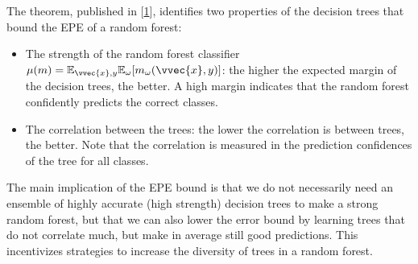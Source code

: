\documentclass[letterpaper,10pt,english]{jupyterBook}
\begin{document}
\sphinxAtStartPar
The theorem, published in {[}\hyperlink{cite.bibliography:id2}{1}{]}, identifies two properties of the decision trees that bound the EPE of a random forest:
\begin{itemize}
\item {} 
\sphinxAtStartPar
The strength of the random forest classifier \(\mu(m)=\mathbb{E}_{\vvec{x},y}\mathbb{E}_\omega[m_\omega(\vvec{x},y)]\): the higher the expected margin of the decision trees, the better. A high margin indicates that the random forest confidently predicts the correct classes.

\item {} 
\sphinxAtStartPar
The correlation between the trees: the lower the correlation is between trees, the better. Note that the correlation is measured in the prediction confidences of the tree for all classes.

\end{itemize}

\sphinxAtStartPar
The main implication of the EPE bound is that we do not necessarily need an ensemble of highly accurate (high strength) decision trees to make a strong random forest, but that we can also lower the error bound by learning trees that do not correlate much, but make in average still good predictions. This incentivizes strategies to increase the diversity of trees in a random forest.
\end{document}
